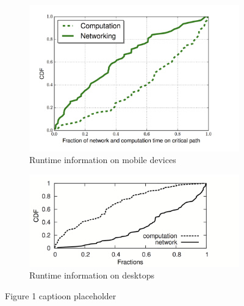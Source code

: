 \begin{figure}[!bth]
\begin{subfigure}[h]{0.5\textwidth}
\centering
\includegraphics[width=\linewidth]{figs/comp_net.png}
\caption{Runtime information on mobile devices}
\label{fig:mobile-runtime}
\end{subfigure}
\begin{subfigure}[h]{0.5\textwidth}
\centering
\includegraphics[width=\linewidth]{figs/comp_net_desk.png}
\caption{Runtime information on desktops}
\label{fig:mobile-runtime}
\end{subfigure}
\caption{{\color{red}Figure 1 captioon placeholder}}
\end{figure}

